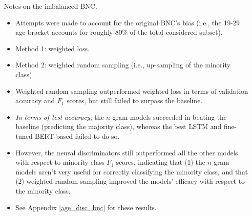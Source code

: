 Notes on the imbalanced BNC.
\begin{itemize}
    \item Attempts were made to account for the original BNC's bias (i.e., the 19-29 age bracket accounts for roughly 80\% of the total considered subset).
    \item Method 1: weighted loss.
    \item Method 2: weighted random sampling (i.e., up-sampling of the minority class).
    \item Weighted random sampling outperformed weighted loss in terms of validation accuracy and $F_1$ scores, but still failed to surpass the baseline.
    \item  \textit{In terms of test accuracy}, the $n$-gram models succeeded in beating the baseline (predicting the majority class), whereas the best LSTM and fine-tuned BERT-based failed to do so.
    \item However, the neural discriminators still outperformed all the other models with respect to minority class $F_1$ scores, indicating that (1) the $n$-gram models aren't very useful for correctly classifying the minority class, and that (2) weighted random sampling improved the models' efficacy with respect to the minority class.
    \item See Appendix \ref{age_disc_bnc} for these results.
\end{itemize}


